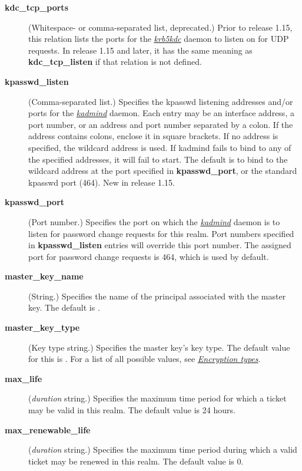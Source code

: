 \documentclass[letterpaper,10pt,english]{sphinxmanual}
\begin{document}
\begin{description}
\item[{\textbf{kdc\_tcp\_ports}}] \leavevmode
(Whitespace- or comma-separated list, deprecated.)  Prior to
release 1.15, this relation lists the ports for the
{\hyperref[admin/admin_commands/krb5kdc:krb5kdc-8]{\emph{krb5kdc}}} daemon to listen on for UDP requests.  In
release 1.15 and later, it has the same meaning as
\textbf{kdc\_tcp\_listen} if that relation is not defined.

\item[{\textbf{kpasswd\_listen}}] \leavevmode
(Comma-separated list.)  Specifies the kpasswd listening addresses
and/or ports for the {\hyperref[admin/admin_commands/kadmind:kadmind-8]{\emph{kadmind}}} daemon.  Each entry may be
an interface address, a port number, or an address and port number
separated by a colon.  If the address contains colons, enclose it
in square brackets.  If no address is specified, the wildcard
address is used.  If kadmind fails to bind to any of the specified
addresses, it will fail to start.  The default is to bind to the
wildcard address at the port specified in \textbf{kpasswd\_port}, or the
standard kpasswd port (464).  New in release 1.15.

\item[{\textbf{kpasswd\_port}}] \leavevmode
(Port number.)  Specifies the port on which the {\hyperref[admin/admin_commands/kadmind:kadmind-8]{\emph{kadmind}}}
daemon is to listen for password change requests for this realm.
Port numbers specified in \textbf{kpasswd\_listen} entries will override
this port number.  The assigned port for password change requests
is 464, which is used by default.

\item[{\textbf{master\_key\_name}}] \leavevmode
(String.)  Specifies the name of the principal associated with the
master key.  The default is .

\item[{\textbf{master\_key\_type}}] \leavevmode
(Key type string.)  Specifies the master key's key type.  The
default value for this is .  For a list of all possible
values, see {\hyperref[admin/conf_files/kdc_conf:encryption-types]{\emph{Encryption types}}}.

\item[{\textbf{max\_life}}] \leavevmode
(\emph{duration} string.)  Specifies the maximum time period for
which a ticket may be valid in this realm.  The default value is
24 hours.

\item[{\textbf{max\_renewable\_life}}] \leavevmode
(\emph{duration} string.)  Specifies the maximum time period
during which a valid ticket may be renewed in this realm.
The default value is 0.


\end{description}
\end{document}
